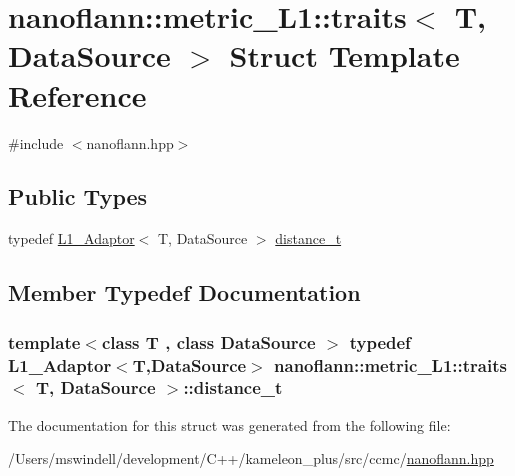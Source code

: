 \hypertarget{structnanoflann_1_1metric___l1_1_1traits}{\section{nanoflann\-:\-:metric\-\_\-\-L1\-:\-:traits$<$ T, Data\-Source $>$ Struct Template Reference}
\label{structnanoflann_1_1metric___l1_1_1traits}
}


{\ttfamily \#include $<$nanoflann.\-hpp$>$}

\subsection*{Public Types}
\begin{DoxyCompactItemize}
\item 
typedef \hyperlink{structnanoflann_1_1_l1___adaptor}{L1\-\_\-\-Adaptor}$<$ T, Data\-Source $>$ \hyperlink{structnanoflann_1_1metric___l1_1_1traits_ad665e193dcbcc2d1cca73964546f5e88}{distance\-\_\-t}
\end{DoxyCompactItemize}


\subsection{Member Typedef Documentation}
\hypertarget{structnanoflann_1_1metric___l1_1_1traits_ad665e193dcbcc2d1cca73964546f5e88}{
\subsubsection[{distance\-\_\-t}]{\setlength{\rightskip}{0pt plus 5cm}template$<$class T , class Data\-Source $>$ typedef {\bf L1\-\_\-\-Adaptor}$<$T,Data\-Source$>$ {\bf nanoflann\-::metric\-\_\-\-L1\-::traits}$<$ T, Data\-Source $>$\-::{\bf distance\-\_\-t}}}\label{structnanoflann_1_1metric___l1_1_1traits_ad665e193dcbcc2d1cca73964546f5e88}


The documentation for this struct was generated from the following file\-:\begin{DoxyCompactItemize}
\item 
/\-Users/mswindell/development/\-C++/kameleon\-\_\-plus/src/ccmc/\hyperlink{nanoflann_8hpp}{nanoflann.\-hpp}\end{DoxyCompactItemize}
